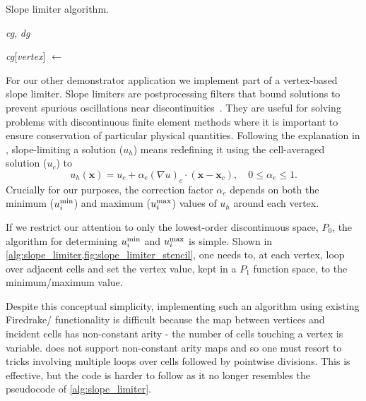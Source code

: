 \documentclass[thesis]{subfiles}
\begin{document}
\begin{algorithm}
  \caption{
    Slope limiter algorithm.
  }
  \begin{algorithmic}[1]
    \Require \textit{cg}, \textit{dg} 

       
        \State \textit{cg}[\textit{vertex}] $\gets$ 
      \EndFor
    \EndFor
  \end{algorithmic}
  \label{alg:slope_limiter}
\end{algorithm}

For our other demonstrator application we implement part of a vertex-based slope limiter.
Slope limiters are postprocessing filters that bound solutions to prevent spurious oscillations near discontinuities~\cite{biswasParallelAdaptiveFinite1994}.
They are useful for solving problems with discontinuous finite element methods where it is important to ensure conservation of particular physical quantities.
Following the explanation in \cite{kuzminVertexbasedHierarchicalSlope2010}, slope-limiting a solution ($u_h$) means redefining it using the cell-averaged solution ($u_c$) to
\begin{equation}
  u_h(\mathbf{x}) = u_c + \alpha_e(\nabla u)_c \cdot (\mathbf{x} - \mathbf{x}_c), \quad 0 \leq \alpha_e \leq 1 .
\end{equation}
Crucially for our purposes, the correction factor $\alpha_e$ depends on both the minimum ($u_i^{\textnormal{min}}$) and maximum ($u_i^{\textnormal{max}}$) values of $u_h$ around each vertex.

If we restrict our attention to only the lowest-order discontinuous space, $P_0$, the algorithm for determining $u_i^{\textnormal{min}}$ and $u_i^{\textnormal{max}}$ is simple.
Shown in \cref{alg:slope_limiter,fig:slope_limiter_stencil}, one needs to, at each vertex, loop over adjacent cells and set the vertex value, kept in a $P_1$ function space, to the minimum/maximum value.

Despite this conceptual simplicity, implementing such an algorithm using existing Firedrake/ functionality is difficult because the map between vertices and incident cells has non-constant arity - the number of cells touching a vertex is variable.
 does not support non-constant arity maps and so one must resort to tricks involving multiple loops over cells followed by pointwise divisions.
This is effective, but the code is harder to follow as it no longer resembles the pseudocode of \cref{alg:slope_limiter}.
\end{document}
